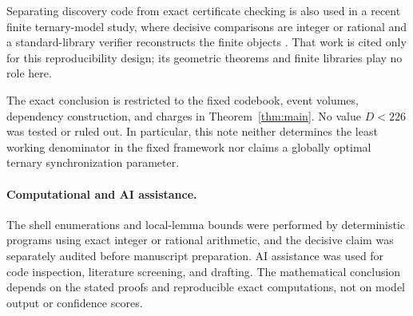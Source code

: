 \documentclass[11pt]{article}
\begin{document}
Separating discovery code from exact certificate checking is also used in a
recent finite ternary-model study, where decisive comparisons are integer or
rational and a standard-library verifier reconstructs the finite objects
\cite{ZengEtAl2026}.  That work is cited only for this reproducibility design;
its geometric theorems and finite libraries play no role here.

The exact conclusion is restricted to the fixed codebook, event volumes,
dependency construction, and charges in Theorem~\ref{thm:main}.  No value
$D<226$ was tested or ruled out.  In particular, this note neither determines
the least working denominator in the fixed framework nor claims a globally
optimal ternary synchronization parameter.

\paragraph{Computational and AI assistance.}
The shell enumerations and local-lemma bounds were performed by deterministic
programs using exact integer or rational arithmetic, and the decisive claim
was separately audited before manuscript preparation.  AI assistance was used
for code inspection, literature screening, and drafting.  The mathematical
conclusion depends on the stated proofs and reproducible exact computations,
not on model output or confidence scores.



\end{document}
